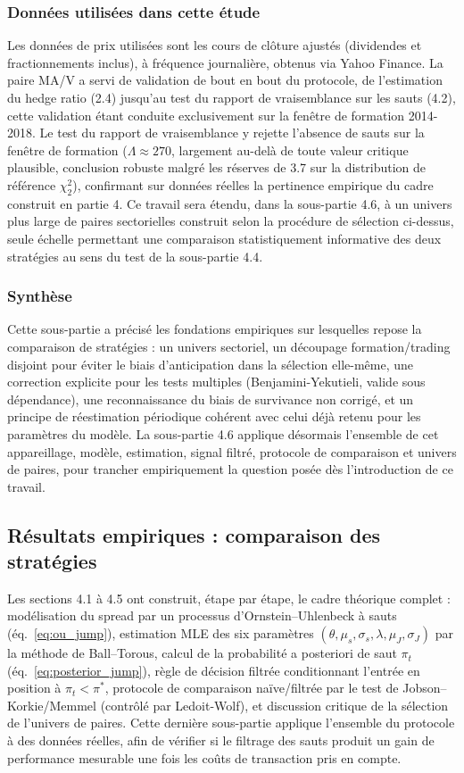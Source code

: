 \documentclass{article}
\begin{document}
\subsubsection*{Données utilisées dans cette étude}
Les données de prix utilisées sont les cours de clôture ajustés (dividendes et fractionnements inclus), à fréquence journalière, obtenus via Yahoo Finance. La paire MA/V a servi de validation de bout en bout du protocole, de l'estimation du hedge ratio (2.4) jusqu'au test du rapport de vraisemblance sur les sauts (4.2), cette validation étant conduite exclusivement sur la fenêtre de formation 2014-2018. Le test du rapport de vraisemblance y rejette l'absence de sauts sur la fenêtre de formation ($\Lambda\approx 270$, largement au-delà de toute valeur critique plausible, conclusion robuste malgré les réserves de 3.7 sur la distribution de référence $\chi^2_2$), confirmant sur données réelles la pertinence empirique du cadre construit en partie 4. Ce travail sera étendu, dans la sous-partie 4.6, à un univers plus large de paires sectorielles construit selon la procédure de sélection ci-dessus, seule échelle permettant une comparaison statistiquement informative des deux stratégies au sens du test de la sous-partie 4.4.
\subsubsection*{Synthèse}
Cette sous-partie a précisé les fondations empiriques sur lesquelles repose la comparaison de stratégies : un univers sectoriel, un découpage formation/trading disjoint pour éviter le biais d'anticipation dans la sélection elle-même, une correction explicite pour les tests multiples (Benjamini-Yekutieli, valide sous dépendance), une reconnaissance du biais de survivance non corrigé, et un principe de réestimation périodique cohérent avec celui déjà retenu pour les paramètres du modèle. La sous-partie 4.6 applique désormais l'ensemble de cet appareillage, modèle, estimation, signal filtré, protocole de comparaison et univers de paires, pour trancher empiriquement la question posée dès l'introduction de ce travail.

\subsection{Résultats empiriques : comparaison des stratégies}

Les sections 4.1 à 4.5 ont construit, étape par étape, le cadre théorique complet : modélisation du spread par un processus d'Ornstein--Uhlenbeck à sauts (éq.~\eqref{eq:ou_jump}), estimation MLE des six paramètres $(\theta,\mu_s,\sigma_s,\lambda,\mu_J,\sigma_J)$ par la méthode de Ball--Torous, calcul de la probabilité a posteriori de saut $\pi_t$ (éq.~\eqref{eq:posterior_jump}), règle de décision filtrée conditionnant l'entrée en position à $\pi_t<\pi^\ast$, protocole de comparaison naïve/filtrée par le test de Jobson--Korkie/Memmel (contrôlé par Ledoit-Wolf), et discussion critique de la sélection de l'univers de paires. Cette dernière sous-partie applique l'ensemble du protocole à des données réelles, afin de vérifier si le filtrage des sauts produit un gain de performance mesurable une fois les coûts de transaction pris en compte.
\end{document}
